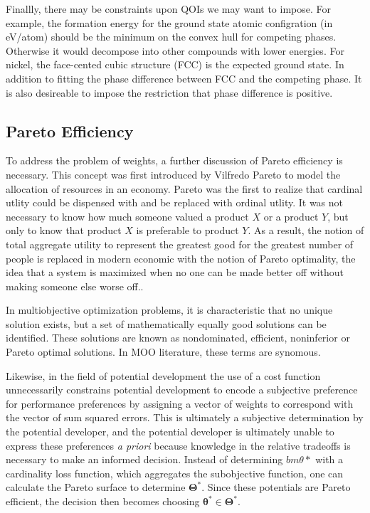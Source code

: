 Finallly, there may be constraints upon QOIs we may want to impose.  For example, the formation energy for the ground state atomic configration (in eV/atom) should be the minimum on the convex hull for competing phases.  Otherwise it would decompose into other compounds with lower energies.  For nickel, the face-cented cubic structure (FCC) is the expected ground state.  In addition to fitting the phase difference between FCC and the competing phase.  It is also desireable to impose the restriction that phase difference is positive.

\subsection{Pareto Efficiency}

To address the problem of weights, a further discussion of Pareto efficiency is necessary. This concept was first introduced by Vilfredo Pareto to model the allocation of resources in an economy\cite{pareto1897_pareto}.  Pareto was the first to realize that cardinal utlity could be dispensed with and be replaced with ordinal utlity\cite{aspers2001_pareto}.  It was not necessary to know how much someone valued a product $X$ or a product $Y$, but only to know that product $X$ is preferable to product $Y$.  As a result, the notion of total aggregate utility to represent the greatest good for the greatest number of people is replaced in modern economic with the notion of Pareto optimality, the idea that a system is maximized when no one can be made better off without making someone else worse off.\cite{mathur1991_pareto}.

In multiobjective optimization problems, it is characteristic that no unique solution exists, but a set of mathematically equally good solutions can be identified.  These solutions are known as nondominated, efficient, noninferior or Pareto optimal solutions.  In MOO literature, these terms are synomous.

Likewise, in the field of potential development the use of a cost function unnecessarily constrains potential development to encode a subjective preference for performance preferences by assigning a vector of weights to correspond with the vector of sum squared errors.  This is ultimately a subjective determination by the potential developer, and the potential developer is ultimately unable to express these preferences \emph{a priori} because knowledge in the relative tradeoffs is necessary to make an informed decision.  Instead of determining $bm{\theta}*$ with a cardinality loss function, which aggregates the subobjective function, one can calculate the Pareto surface to determine $\bm{\Theta}^*$.  Since these potentials are Pareto efficient, the decision then becomes choosing $\bm{\theta}^* \in \bm{\Theta}^*$.

